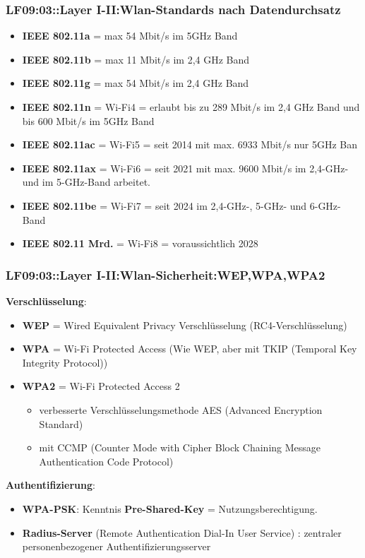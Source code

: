 \begin{frame}  
  \frametitle{LF09:03::Layer I-II:Wlan-Standards nach Datendurchsatz }
  \begin{small}

  \begin{itemize}
    \item \textbf{IEEE 802.11a} = max 54 Mbit/s im 5GHz Band
    \item \textbf{IEEE 802.11b} = max 11 Mbit/s im 2,4 GHz Band
    \item \textbf{IEEE 802.11g} = max 54 Mbit/s im 2,4 GHz Band
    \item \textbf{IEEE 802.11n} = Wi-Fi4 = erlaubt bis zu 289 Mbit/s im 2,4 GHz Band und bis 600 Mbit/s im 5GHz Band
    \item \textbf{IEEE 802.11ac} = Wi-Fi5 = seit 2014 mit max. 6933 Mbit/s nur 5GHz Ban
    \item \textbf{IEEE 802.11ax} = Wi-Fi6 = seit 2021 mit max. 9600 Mbit/s im 2,4-GHz- und im 5-GHz-Band arbeitet. 
    \item \textbf{IEEE 802.11be} = Wi-Fi7 = seit 2024 im 2,4-GHz-, 5-GHz- und 6-GHz-Band
    \item \textbf{IEEE 802.11 Mrd.} = Wi-Fi8 = voraussichtlich 2028 
  \end{itemize}
\end{small}

\end{frame}

\begin{frame}  
  \frametitle{LF09:03::Layer I-II:Wlan-Sicherheit:WEP,WPA,WPA2}

   \textbf{Verschlüsselung}:

  \begin{itemize}
    \item \textbf{WEP} = Wired Equivalent Privacy Verschlüsselung (RC4-Verschlüsselung)  
    \item \textbf{WPA} = Wi-Fi Protected Access (Wie WEP, aber mit TKIP (Temporal Key Integrity Protocol))
    \item \textbf{WPA2} = Wi-Fi Protected Access 2 
   \begin{itemize}
      \item verbesserte Verschlüsselungsmethode AES (Advanced Encryption Standard) 
      \item mit CCMP (Counter Mode with Cipher Block Chaining Message Authentication Code Protocol) 
    \end{itemize}  
  \end{itemize}

  \vspace{0.2cm}
  \textbf{Authentifizierung}:

  \begin{itemize}
    \item \textbf{WPA-PSK}:  Kenntnis \textbf{Pre-Shared-Key} =  Nutzungsberechtigung.
    \item \textbf{Radius-Server} (Remote Authentication Dial-In User Service) : zentraler personenbezogener Authentifizierungsserver
  \end{itemize}

\end{frame}

